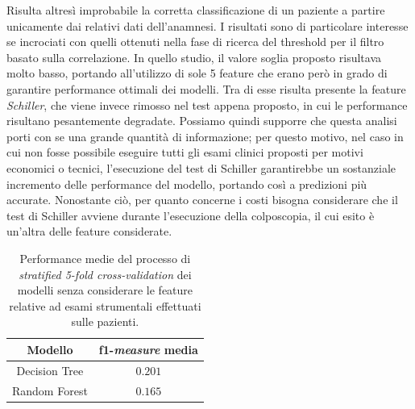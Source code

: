 Risulta altresì improbabile la corretta classificazione di un paziente a partire unicamente dai relativi dati dell'anamnesi.
I risultati sono di particolare interesse se incrociati con quelli ottenuti nella fase di ricerca del threshold per il filtro basato sulla correlazione. In quello studio, il valore soglia proposto risultava molto basso, portando all'utilizzo di sole 5 feature che erano però in grado di garantire performance ottimali dei modelli. Tra di esse risulta presente la feature \textit{Schiller}, che viene invece rimosso nel test appena proposto, in cui le performance risultano pesantemente degradate. Possiamo quindi supporre che questa analisi porti con se una grande quantità di informazione; per questo motivo, nel caso in cui non fosse possibile eseguire tutti gli esami clinici proposti per motivi economici o tecnici, l'esecuzione del test di Schiller garantirebbe un sostanziale incremento delle performance del modello, portando così a predizioni più accurate.
Nonostante ciò, per quanto concerne i costi bisogna considerare che il test di Schiller avviene durante l'esecuzione della colposcopia, il cui esito è un'altra delle feature considerate.
\begin{table}
	\centering
	\caption{Performance medie del processo di \textit{stratified 5-fold cross-validation} dei modelli senza considerare le feature relative ad esami strumentali effettuati sulle pazienti.}
	\label{tab:noexamsscore}
	\begin{tabular}{|c|c|}
		\toprule
		Modello & f1-\textit{measure} media \\ 
		\midrule 
		Decision Tree & $0.201$ \\
		Random Forest & $0.165$ \\ 
		\bottomrule
	\end{tabular}
\end{table}